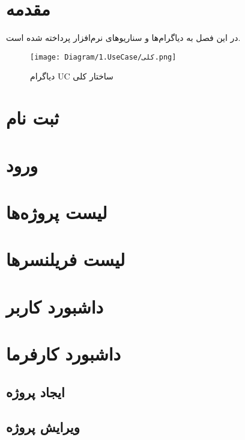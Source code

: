 


\section*{مقدمه}
در این فصل به دیاگرام‌ها و سناریوهای نرم‌افزار پرداخته شده است.
\begin{figure}[H]
	\centering
	\texttt{[image: Diagram/1.UseCase/کلی.png]}
	\caption{دیاگرام UC ساختار کلی}
	\label{fig:uc:ساختار-کلی}
\end{figure}

\section{‌ثبت نام}


\section{ورود}


\section{لیست پروژه‌ها}


\section{لیست فریلنسرها}



\section{داشبورد کاربر}


\section{داشبورد کارفرما}


\subsection{ایجاد پروژه}


\subsection{ویرایش پروژه}


